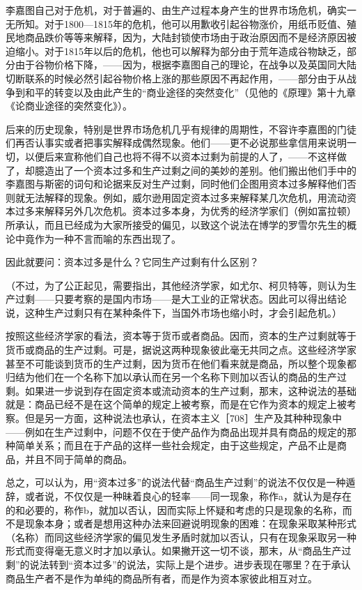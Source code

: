 李嘉图自己对于危机，对于普遍的、由生产过程本身产生的世界市场危机，确实一无所知。对于1800—1815年的危机，他可以用歉收引起谷物涨价，用纸币贬值、殖民地商品跌价等等来解释，因为，大陆封锁使市场由于政治原因而不是经济原因被迫缩小。对于1815年以后的危机，他也可以解释为部分由于荒年造成谷物缺乏，部分由于谷物价格下降，——因为，根据李嘉图自己的理论，在战争以及英国同大陆切断联系的时候必然引起谷物价格上涨的那些原因不再起作用，——部分由于从战争到和平的转变以及由此产生的“商业途径的突然变化”（见他的《原理》第十九章《论商业途径的突然变化》）。

后来的历史现象，特别是世界市场危机几乎有规律的周期性，不容许李嘉图的门徒们再否认事实或者把事实解释成偶然现象。他们——更不必说那些拿信用来说明一切，以便后来宣称他们自己也将不得不以资本过剩为前提的人了，——不这样做了，却臆造出了一个资本过多和生产过剩之间的美妙的差别。他们搬出他们手中的李嘉图与斯密的词句和论据来反对生产过剩，同时他们企图用资本过多解释他们否则就无法解释的现象。例如，威尔逊用固定资本过多来解释某几次危机，用流动资本过多来解释另外几次危机。资本过多本身，为优秀的经济学家们（例如富拉顿）所承认，而且已经成为大家所接受的偏见，以致这个说法在博学的罗雪尔先生的概论中竟作为一种不言而喻的东西出现了。

因此就要问：资本过多是什么？它同生产过剩有什么区别？

（不过，为了公正起见，需要指出，其他经济学家，如尤尔、柯贝特等，则认为生产过剩——只要考察的是国内市场——是大工业的正常状态。因此可以得出结论说，这种生产过剩只有在某种条件下，当国外市场也缩小时，才会引起危机。）

按照这些经济学家的看法，资本等于货币或者商品。因而，资本的生产过剩就等于货币或商品的生产过剩。可是，据说这两种现象彼此毫无共同之点。这些经济学家甚至不可能谈到货币的生产过剩，因为货币在他们看来就是商品，所以整个现象都归结为他们在一个名称下加以承认而在另一个名称下则加以否认的商品的生产过剩。如果进一步说到存在固定资本或流动资本的生产过剩，那末，这种说法的基础就是：商品已经不是在这个简单的规定上被考察，而是在它作为资本的规定上被考察。但是另一方面，这种说法也承认，在资本主义［708］生产及其种种现象中——例如在生产过剩中，问题不仅在于使产品作为商品出现并具有商品的规定的那种简单关系；而且在于产品的这样一些社会规定，由于这些规定，产品不止是商品，并且不同于简单的商品。

总之，可以认为，用“资本过多”的说法代替“商品生产过剩”的说法不仅仅是一种遁辞，或者说，不仅仅是一种昧着良心的轻率——同一现象，称作a，就认为是存在的和必要的，称作b，就加以否认，因而实际上怀疑和考虑的只是现象的名称，而不是现象本身；或者是想用这种办法来回避说明现象的困难：在现象采取某种形式（名称）而同这些经济学家的偏见发生矛盾时就加以否认，只有在现象采取另一种形式而变得毫无意义时才加以承认。如果撇开这一切不谈，那末，从“商品生产过剩”的说法转到“资本过多”的说法，实际上是个进步。进步表现在哪里？在于承认商品生产者不是作为单纯的商品所有者，而是作为资本家彼此相互对立。

